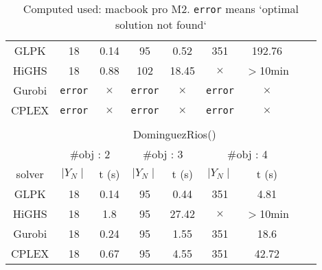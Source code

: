 \documentclass[11pt]{report}
\begin{document}
\begin{table}[htp]
\begin{center}
\begin{tabular}{|c|c|c|c|c|c|c|c|c|}
\hline
GLPK   &  18   & 0.14  & 95 & 0.52  & 351 & 192.76 \\
HiGHS  &  18   & 0.88 & 102 & 18.45 & $\times$ & $>$10min\\
Gurobi    & \texttt{error}  &   $\times$  & \texttt{error}  &   $\times$  & \texttt{error}  &   $\times$   \\
CPLEX & \texttt{error}  &   $\times$  & \texttt{error}  &   $\times$  & \texttt{error}  &   $\times$  \\
\hline
\multicolumn{7}{c}{} \\
%
\cline{2-7}
\multicolumn{1}{c}{}  & \multicolumn{6}{|c|}{DominguezRios()} \\
%
\cline{2-7}
\multicolumn{1}{c}{} & \multicolumn{2}{|c|}{\#obj : 2 } 
                                & \multicolumn{2}{|c|}{\#obj : 3 } 
                                & \multicolumn{2}{|c|}{\#obj : 4 }\\
\hline
solver & $\mid Y_N \mid$ & t (s) 
           & $\mid Y_N \mid$ & t (s)
           & $\mid Y_N \mid$ & t (s)\\                                
\hline
GLPK   &  18   & 0.14  & 95 & 0.44  & 351 & 4.81 \\
HiGHS  &  18   & 1.8   & 95 & 27.42 & $\times$ & $>$10min\\
Gurobi  &   18   & 0.24 & 95   & 1.55 & 351 & 18.6 \\
CPLEX &   18   & 0.67 & 95   & 4.55 & 351 & 42.72  \\
\hline

\end{tabular}
\end{center}
\caption{Computed used: macbook pro M2. 
 \texttt{error} means `optimal solution not found`}
\label{default}
\end{table}
\end{document}
